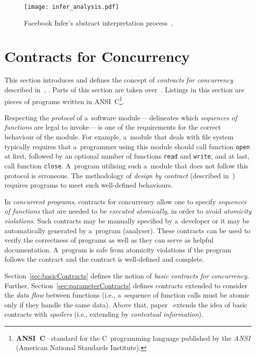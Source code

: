 \begin{figure}[hbt]
    \centering
    \texttt{[image: infer\_analysis.pdf]}
    \caption{%
        Facebook Infer's abstract interpretation
        process~\cite{inferAISlides}, \cite{projectPracticeMarcin2018}
    }
    \label{fig:inferAnalysis}
\end{figure}


\section{Contracts for Concurrency}
\label{sec:contracts}

This section introduces and defines the concept of \emph{contracts for
concurrency} described in~\cite{contracts2015}, \cite{contracts2017}. Parts
of this section are taken over~\cite{excel2019FBInfer}. Listings in this
section are pieces of programs written in ANSI~C\footnote{%
\textbf{ANSI~C}\,--\,standard for the C~programming language published by
the \emph{ANSI} (American National Standards Institute).}.

Respecting the \emph{protocol} of a~software module\,---\,delineates
which \emph{sequences of functions} are legal to invoke\,---\,is one of the
requirements for the correct behaviour of the module. For example, a~module
that deals with file system typically requires that a~programmer using
this module should call function \texttt{open} at first, followed by an
optional number of functions \texttt{read} and \texttt{write}, and at last,
call function \texttt{close}. A~program utilising such a~module that does
not follow this protocol is erroneous. The methodology of \emph{design by
contract} (described in~\cite{contract}) requires programs to meet
such well-defined behaviours.~\cite{contracts2015}

In \emph{concurrent programs}, contracts for concurrency allow one to specify
\emph{sequences of functions} that are needed to be \emph{executed
atomically}, in order to avoid \emph{atomicity violations}. Such contracts
may be manually specified by a~developer or it may be automatically generated
by a~program (analyser). These contracts can be used to verify the correctness
of programs as well as they can serve as helpful documentation. A~program is
safe from atomicity violations if the program follows the contract and
the contract is well-defined and complete.

Section~\ref{sec:basicContracts} defines the notion of \emph{basic contracts
for concurrency}. Further, Section~\ref{sec:parameterContracts} defines
contracts extended to consider the \emph{data flow} between functions (i.e.,
a~sequence of function calls must be atomic only if they handle the
same data). Above that, paper~\cite{contracts2017} extends the idea
of basic contracts with \emph{spoilers} (i.e., extending by
\emph{contextual information}).



